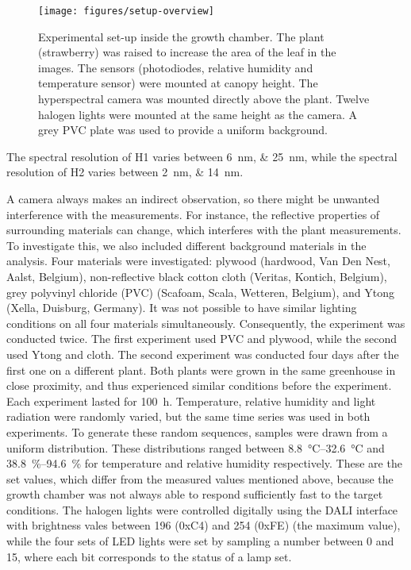         \begin{figure}[thb]
            \centering
            \texttt{[image: figures/setup-overview]}
            \caption{Experimental set-up inside the growth chamber. The plant (strawberry) was raised to increase the area of the leaf in the images. The sensors (photodiodes, relative humidity and temperature sensor) were mounted at canopy height. The hyperspectral camera was mounted directly above the plant. Twelve halogen lights were mounted at the same height as the camera. A grey PVC plate was used to provide a uniform background.}
            \label{setup-overview}
        \end{figure}
        
        The spectral resolution of H1 varies between \SIlist{6;25}{\nano\metre}, while the spectral resolution of H2 varies between \SIlist{2;14}{\nano\metre}.
        
        A camera always makes an indirect observation, so there might be unwanted interference with the measurements. For instance, the reflective properties of surrounding materials can change, which interferes with the plant measurements. To investigate this, we also included different background materials in the analysis. Four materials were investigated: plywood (hardwood, Van Den Nest, Aalst, Belgium), non-reflective black cotton cloth (Veritas, Kontich, Belgium), grey polyvinyl chloride (PVC) (Scafoam, Scala, Wetteren, Belgium), and Ytong (Xella, Duisburg, Germany). It was not possible to have similar lighting conditions on all four materials simultaneously. Consequently, the experiment was conducted twice. The first experiment used PVC and plywood, while the second used Ytong and cloth. The second experiment was conducted four days after the first one on a different plant. Both plants were grown in the same greenhouse in close proximity, and thus experienced similar conditions before the experiment. Each experiment lasted for \SI{100}{\hour}. Temperature, relative humidity and light radiation were randomly varied, but the same time series was used in both experiments. To generate these random sequences, samples were drawn from a uniform distribution. These distributions ranged between 
        \SIrange{8.8}{32.6}{\celsius} and \SIrange{38.8}{94.6}{\percent} for temperature and relative humidity respectively. These are the set values, which differ from the measured values mentioned above, because the growth chamber was not always able to respond sufficiently fast to the target conditions. The halogen lights were controlled digitally using the DALI interface with brightness vales between 196 (0xC4) and 254 (0xFE) (the maximum value), while the four sets of LED lights were set by sampling a number between 0 and 15, where each bit corresponds to the status of a lamp set. 
        
